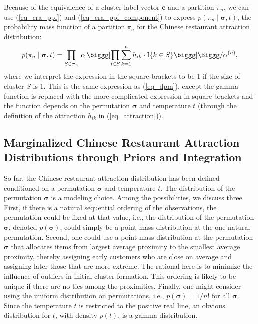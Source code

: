 \documentclass[lineno]{biometrika-dbd}
\newcommand{\partition}{\ensuremath{\pi}}
\newcommand{\mass}{\alpha}
\begin{document}
Because of the equivalence of a cluster label vector $\bm{c}$ and a partition $\partition_n$,
we can use (\ref{eq_cra_ppf}) and (\ref{eq_cra_ppf_component}) to express
$p(\partition_n \mid \bm{\sigma}, t)$,
the probability mass function of a partition $\partition_n$ for the Chinese restaurant attraction distribution:
\begin{equation}
\label{eq_cra}
p(\partition_n \mid \bm{\sigma}, t) = \prod_{S \in \partition_n} \, \mass \, \biggg[ \prod_{i \in S} \sum_{k=1}^n h_{ik} \cdot \text{I}\{ k \in S \} \biggg] \Biggg/ \mass^{(n)},
\end{equation}
where we interpret the expression in the square brackets to be 1 if the size of
cluster $S$ is 1.  This is the same expression as (\ref{eq_dpm}), except the
gamma function is replaced with the more complicated expression in square
brackets and the function depends on the permutation $\bm{\sigma}$ and
temperature $t$ (through the definition of the attraction $h_{ik}$ in
(\ref{eq_attraction})).

\subsection{Marginalized Chinese Restaurant Attraction Distributions through Priors and Integration}
\label{sec_mcra}

So far, the Chinese restaurant attraction distribution has been defined
conditioned on a permutation $\bm{\sigma}$ and temperature $t$.  The
distribution of the permutation $\bm{\sigma}$ is a modeling choice.  Among the
possibilities, we discuss three.  First, if there is a natural sequential
ordering of the observations, the permutation could be fixed at that value,
i.e., the distribution of the permutation $\bm{\sigma}$, denoted
$p(\bm{\sigma})$, could simply be a point mass distribution at the one natural
permutation.  Second, one could use a point mass distribution at the
permutation $\bm{\sigma}$ that allocates items from largest average proximity
to the smallest average proximity, thereby assigning early customers who are
close on average and assigning later those that are more extreme.  The rational
here is to minimize the influence of outliers in initial cluster formation.
This ordering is likely to be unique if there are no ties among the
proximities.  Finally, one might consider using the uniform distribution on
permutations, i.e., $p(\bm{\sigma}) = 1/n!$ for all $\bm{\sigma}$.  Since the
temperature $t$ is restricted to the positive real line, an obvious
distribution for $t$, with density $p(t)$, is a gamma distribution.
\end{document}
